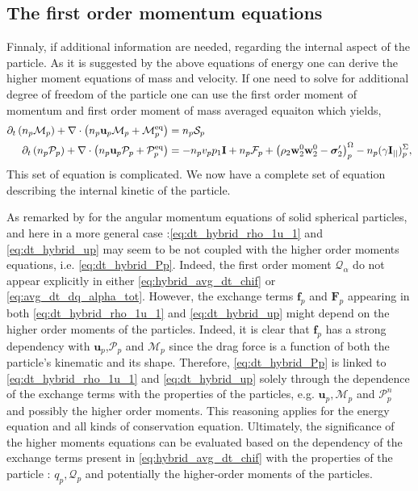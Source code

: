 \subsection{The first order momentum equations}

Finnaly, if additional information are needed, regarding the internal aspect of the particle. 
As it is suggested by the above equations of energy one can derive the higher moment equations of mass and velocity. 
If one need to solve for additional degree of freedom of the particle one can use the first order moment of momentum and first order moment of mass averaged equaiton which yields, 
\begin{align}
    \partial_t \left(n_p \mathcal{M}_p\right)
    + \mathbf{\nabla}\cdot \left(
        n_p \textbf{u}_p \mathcal{M}_p
    + \mathcal{M}_p^\text{eq}
    \right)
    &=
    n_p \mathcal{S}_p\\
    \label{eq:dt_hybrid_Pp}
    \partial_t \left(n_p \mathcal{P}_p\right)
    + \mathbf{\nabla}\cdot \left(
        n_p \textbf{u}_p \mathcal{P}_p
    + \mathcal{P}_p^\text{eq}
    \right)
    &=
    -n_p v_p p_1 \textbf{I}
    + n_p \mathcal{F}_p
    + \left(
        \rho_2 \textbf{w}_2^0  \textbf{w}_2^0 
        - \bm{\sigma}_2'
    \right)^\Omega_p
    - n_p (\gamma \textbf{I}_{||})^\Sigma_p,
\end{align}
This set of equation is complicated. 
We now have a complete set of equation describing the internal kinetic of the particle. 



As remarked by \citet{jackson1997locally} for the angular momentum equations of solid spherical particles, and here in a more general case :\ref{eq:dt_hybrid_rho_1u_1} and \ref{eq:dt_hybrid_up} may seem to be not coupled with the higher order moments equations, i.e. \ref{eq:dt_hybrid_Pp}. 
Indeed, the first order moment $\mathcal{Q}_\alpha$ do not appear explicitly in either \ref{eq:hybrid_avg_dt_chif} or \ref{eq:avg_dt_dq_alpha_tot}.
However, the exchange terms 
$\textbf{f}_p$ 
and 
$\textbf{F}_p$ 
appearing in both \ref{eq:dt_hybrid_rho_1u_1} and \ref{eq:dt_hybrid_up} might depend on the higher order moments of the particles.
Indeed, it is clear that $\textbf{f}_p$ has a strong dependency with $\textbf{u}_p$,$\mathcal{P}_p$ and $\mathcal{M}_p$ since the drag force is a function of both the particle's kinematic and its shape. 
Therefore, \ref{eq:dt_hybrid_Pp} is linked to \ref{eq:dt_hybrid_rho_1u_1} and \ref{eq:dt_hybrid_up} solely through the dependence of the exchange terms with the properties of the particles, e.g. $\textbf{u}_p,\mathcal{M}_p$ and $\mathcal{P}^n_p$ and possibly the higher order moments. 
This reasoning applies for the energy equation and all kinds of conservation equation. 
Ultimately, the significance of the higher moments equations can be evaluated based on the dependency of the exchange terms present in \ref{eq:hybrid_avg_dt_chif} with the properties of the particle : $q_p, \mathcal{Q}_p$ and potentially the higher-order moments of the particles. 


